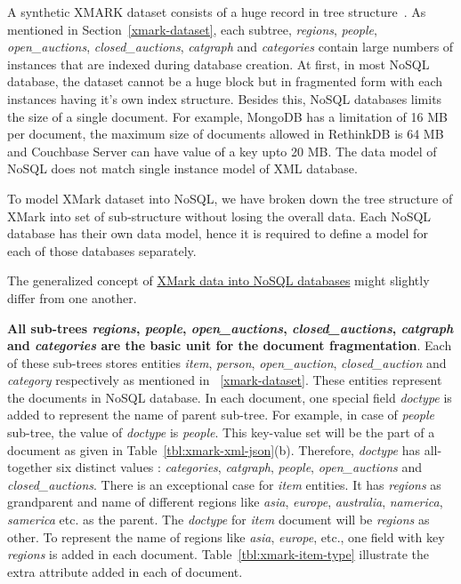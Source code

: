 A synthetic XMARK dataset consists of a huge record in tree structure~\citep{xmark/VIST}. As mentioned in Section~\ref{xmark-dataset}, each subtree, \textit{regions}, \textit{people}, \textit{open\_auctions}, \textit{closed\_auctions}, \textit{catgraph} and \textit{categories} contain large numbers of instances that are indexed during database creation. At first, in most NoSQL database, the dataset cannot be a huge block but in fragmented form with each instances having it's own index structure. Besides this, NoSQL databases limits the size of a single document. For example, MongoDB has a limitation of 16 MB per document, the maximum size of documents allowed in RethinkDB is 64 MB and Couchbase Server can have value of a key upto 20 MB. The data model of NoSQL does not match single instance model of XML database.
\par 
To model XMark dataset into NoSQL, we have broken down the tree structure of XMark  into set of sub-structure without losing the overall data. Each NoSQL database has their own data model, hence it is required to define a model for each of those databases separately.

The generalized concept of \underline {XMark data into NoSQL databases} might slightly differ from one another. 

\textbf{All sub-trees \textit{regions}, \textit{people}, \textit{open\_auctions}, \textit{closed\_auctions}, \textit{catgraph} and \textit{categories} are the basic unit for the document fragmentation}. Each of these sub-trees stores entities \textit{item}, \textit{person}, \textit{open\_auction}, \textit{closed\_auction} and \textit{category} respectively as mentioned in ~\ref{xmark-dataset}. These entities represent the documents in NoSQL database. In each document, one special field \textit{doctype} is added to represent the name of parent sub-tree. For example, in case of \textit{people} sub-tree, the value of \textit{doctype} is \textit{people}. This key-value set will be the part of a document as  given in Table~\ref{tbl:xmark-xml-json}(b). Therefore, \textit{doctype} has all-together six distinct values : \textit{categories}, \textit{catgraph}, \textit{people}, \textit{open\_auctions} and \textit{closed\_auctions}. There is an exceptional case for \textit{item} entities. It has \textit{regions} as grandparent and name of different regions like \textit{asia}, \textit{europe}, \textit{australia}, \textit{namerica}, \textit{samerica} etc. as the parent.  The \textit{doctype} for \textit{item} document will be \textit{regions} as other. To represent the name of regions like \textit{asia}, \textit{europe}, etc.,  one field with key \textit{regions} is added in each document. 
Table~\ref{tbl:xmark-item-type} illustrate the extra attribute added in each of document.

